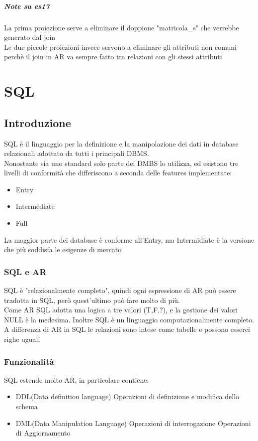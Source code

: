 \documentclass[12pt, a4paper, openany]{book}
\begin{document}
\paragraph*{Note su es17}
La prima proiezione serve a eliminare il doppione "matricola\_s" che verrebbe generato dal join\\
Le due piccole proiezioni invece servono a eliminare gli attributi non comuni perchè il join in AR va sempre fatto tra relazioni con gli stessi attributi
\chapter{SQL}
\section{Introduzione}
SQL è il linguaggio per la definizione e la manipolazione dei dati in database relazionali adottato da tutti i principali DBMS.\\
Nonostante sia uno standard solo parte dei DMBS lo utilizza, ed esistono tre livelli di conformità che differiscono a seconda delle features implementate:
\begin{itemize}
    \item Entry
    \item Intermediate
    \item Full
\end{itemize}
La maggior parte dei database è conforme all'Entry, ma Intermidiate è la versione che più soddisfa le esigenze di mercato
\subsection*{SQL e AR}
SQL è "relazionalmente completo", quindi ogni espressione di AR può essere tradotta in SQL, però quest'ultimo può fare molto di più.
\\Come AR SQL adotta una logica a tre valori (T,F,?), e la gestione dei valori NULL è la medesima. Inoltre SQL è un linguaggio computazionalmente completo.
A differenza di AR in SQL le relazioni sono intese come tabelle e possono esserci righe uguali
\subsection*{Funzionalità}
SQL estende molto AR, in particolare contiene:
\begin{itemize}
    \item DDL(Data definition language)
    \subitem Operazioni di definizione e modifica dello schema
    \item DML(Data Manipulation Language)
    \subitem Operazioni di interrogazione
    \subitem Operazioni di Aggiornamento 
\end{itemize}
\end{document}
